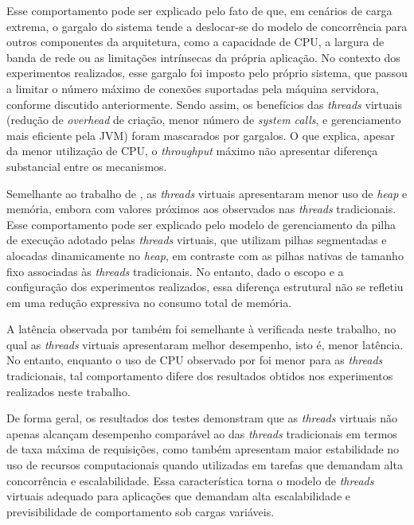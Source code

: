 \documentclass[12pt, openright, oneside, a4paper, english,	french,	spanish, brazil	]{abntex2}
\begin{document}
Esse comportamento pode ser explicado pelo fato de que, em cenários de carga extrema, o gargalo do sistema tende a deslocar-se do modelo de concorrência para outros componentes da arquitetura, como a capacidade de CPU, a largura de banda de rede ou as limitações intrínsecas da própria aplicação. No contexto dos experimentos realizados, esse gargalo foi imposto pelo próprio sistema, que passou a limitar o número máximo de conexões suportadas pela máquina servidora, conforme discutido anteriormente. Sendo assim, os benefícios das \textit{threads} virtuais (redução de \textit{overhead} de criação, menor número de \textit{system calls}, e gerenciamento mais eficiente pela JVM) foram mascarados por gargalos. O que explica, apesar da menor utilização de CPU, o \textit{throughput} máximo não apresentar diferença substancial entre os mecanismos.

Semelhante ao trabalho de , as \textit{threads} virtuais apresentaram menor uso de \textit{heap} e memória, embora com valores próximos aos observados nas \textit{threads} tradicionais. Esse comportamento pode ser explicado pelo modelo de gerenciamento da pilha de execução adotado pelas \textit{threads} virtuais, que utilizam pilhas segmentadas e alocadas dinamicamente no \textit{heap}, em contraste com as pilhas nativas de tamanho fixo associadas às \textit{threads} tradicionais. No entanto, dado o escopo e a configuração dos experimentos realizados, essa diferença estrutural não se refletiu em uma redução expressiva no consumo total de memória.

A latência observada por  também foi semelhante à verificada neste trabalho, no qual as \textit{threads} virtuais apresentaram melhor desempenho, isto é, menor latência. No entanto, enquanto o uso de CPU observado por  foi menor para as \textit{threads} tradicionais, tal comportamento difere dos resultados obtidos nos experimentos realizados neste trabalho. 

De forma geral, os resultados dos testes demonstram que as \textit{threads} virtuais não apenas alcançam desempenho comparável ao das \textit{threads} tradicionais em termos de taxa máxima de requisições, como também apresentam maior estabilidade no uso de recursos computacionais quando utilizadas em tarefas que demandam alta concorrência e escalabilidade. Essa característica torna o modelo de \textit{threads} virtuais adequado para aplicações que demandam alta escalabilidade e previsibilidade de comportamento sob cargas variáveis.
\end{document}
